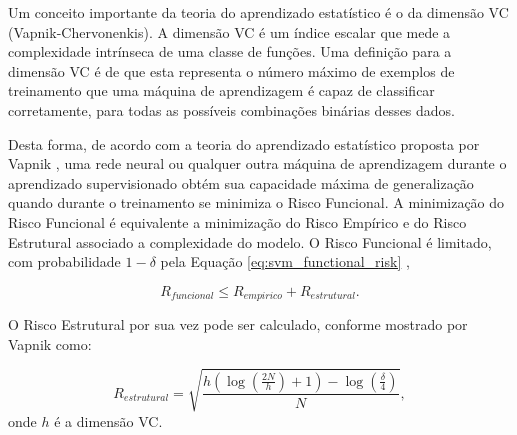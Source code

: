 Um conceito importante da teoria do aprendizado estatístico é o da dimensão VC (Vapnik-Chervonenkis). A dimensão VC é um índice escalar que mede a complexidade intrínseca de uma classe de funções. Uma definição para a dimensão VC é de que esta representa o número máximo de exemplos de treinamento que uma máquina de aprendizagem é capaz de classificar corretamente, para todas as possíveis combinações binárias desses dados.

Desta forma, de acordo com a teoria do aprendizado estatístico proposta por Vapnik \cite{vapnik1998statistical}, uma rede neural ou qualquer outra máquina de aprendizagem durante o aprendizado supervisionado obtém sua capacidade máxima de generalização quando durante o treinamento se minimiza o Risco Funcional. A minimização do Risco Funcional é equivalente a minimização do Risco Empírico e do Risco Estrutural associado a complexidade do modelo. O Risco Funcional é limitado, com probabilidade $1 - \delta$ pela Equação \ref{eq:svm_functional_risk} \label{symbol:rfuncional},

\begin{equation}
\label{eq:svm_functional_risk}
R_{funcional} \leq R_{empirico} + R_{estrutural} .
\end{equation}

O Risco Estrutural \label{symbol:restrutural} por sua vez pode ser calculado, conforme mostrado por Vapnik \cite{vapnik1998statistical} como:

\begin{equation}
\label{eq:svm_structural_risk}
R_{estrutural} = \sqrt{\frac{h \left( \log \left( \frac{2N}{h} \right) + 1 \right) - \log \left( \frac{\delta}{4} \right)}{N}},
\end{equation}
onde $h$ é a dimensão VC.

